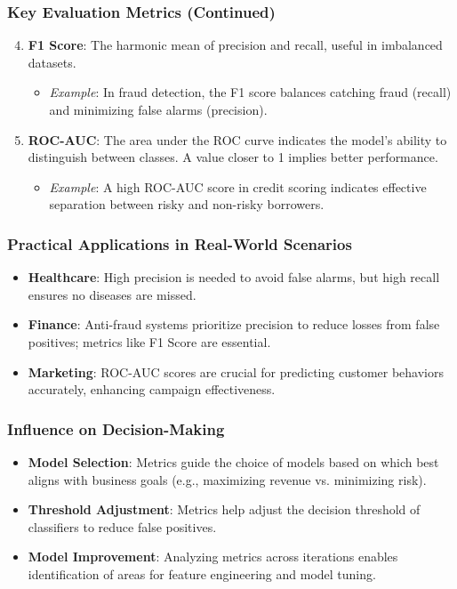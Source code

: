 \documentclass[aspectratio=169]{beamer}
\begin{document}
\begin{frame}[fragile]
    \frametitle{Key Evaluation Metrics (Continued)}
    \begin{enumerate}
        \setcounter{enumi}{3} %
        \item \textbf{F1 Score}: The harmonic mean of precision and recall, useful in imbalanced datasets.
        \begin{itemize}
            \item \textit{Example}: In fraud detection, the F1 score balances catching fraud (recall) and minimizing false alarms (precision).
        \end{itemize}
        
        \item \textbf{ROC-AUC}: The area under the ROC curve indicates the model’s ability to distinguish between classes. A value closer to 1 implies better performance.
        \begin{itemize}
            \item \textit{Example}: A high ROC-AUC score in credit scoring indicates effective separation between risky and non-risky borrowers.
        \end{itemize}
    \end{enumerate}
\end{frame}

\begin{frame}[fragile]
    \frametitle{Practical Applications in Real-World Scenarios}
    \begin{itemize}
        \item \textbf{Healthcare}: High precision is needed to avoid false alarms, but high recall ensures no diseases are missed.
        \item \textbf{Finance}: Anti-fraud systems prioritize precision to reduce losses from false positives; metrics like F1 Score are essential.
        \item \textbf{Marketing}: ROC-AUC scores are crucial for predicting customer behaviors accurately, enhancing campaign effectiveness.
    \end{itemize}
\end{frame}

\begin{frame}[fragile]
    \frametitle{Influence on Decision-Making}
    \begin{itemize}
        \item \textbf{Model Selection}: Metrics guide the choice of models based on which best aligns with business goals (e.g., maximizing revenue vs. minimizing risk).
        \item \textbf{Threshold Adjustment}: Metrics help adjust the decision threshold of classifiers to reduce false positives.
        \item \textbf{Model Improvement}: Analyzing metrics across iterations enables identification of areas for feature engineering and model tuning.
    \end{itemize}
\end{frame}
\end{document}
